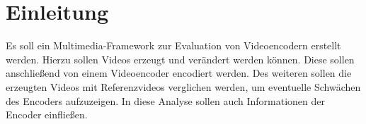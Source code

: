 \section{Einleitung}


Es soll ein Multimedia-Framework zur Evaluation von Videoencodern erstellt werden. Hierzu sollen Videos erzeugt und verändert werden können. Diese sollen anschließend von einem Videoencoder encodiert werden. Des weiteren sollen die erzeugten Videos mit Referenzvideos verglichen werden, um eventuelle Schwächen des Encoders aufzuzeigen. In diese Analyse sollen auch Informationen der Encoder einfließen.
